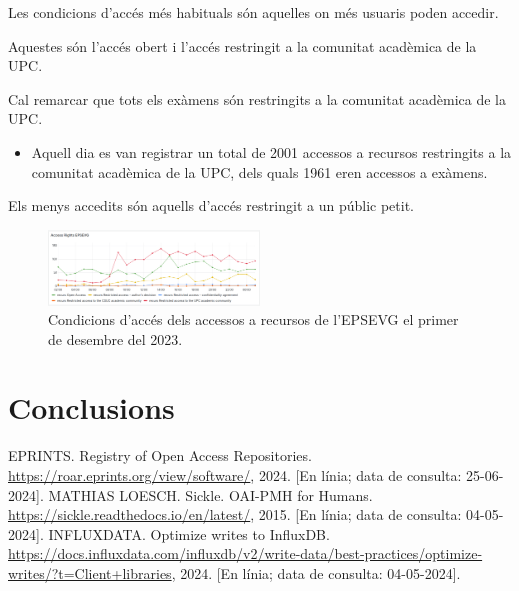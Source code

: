 \documentclass[lettersize,journal]{IEEEtran}
\begin{document}
Les condicions d'accés més habituals són aquelles on més usuaris poden accedir.

Aquestes són l'accés obert i l'accés restringit a la comunitat acadèmica de la UPC.

Cal remarcar que tots els exàmens són restringits a la comunitat acadèmica de la UPC.
\begin{itemize}
    \item Aquell dia es van registrar un total de 2001 accessos a recursos restringits a la comunitat acadèmica de la UPC, dels quals 1961 eren accessos a exàmens.
\end{itemize}

Els menys accedits són aquells d'accés restringit a un públic petit.

\begin{figure}[!t]
    \centerline{\includegraphics[width=0.5\textwidth]{figures/access-rights-epsevg}}
    \caption{Condicions d'accés dels accessos a recursos de l'EPSEVG el primer de desembre del 2023.}\label{fig:log-access-type}
\end{figure}

\section{Conclusions}\label{sec:conclusions}

\begin{thebibliography}{1}

    EPRINTS. Registry of Open Access Repositories. \url{https://roar.eprints.org/view/software/}, 2024. [En línia; data de consulta: 25-06-2024].
    MATHIAS LOESCH. Sickle. OAI-PMH for Humans. \url{https://sickle.readthedocs.io/en/latest/}, 2015. [En línia; data de consulta: 04-05-2024].
    INFLUXDATA. Optimize writes to InfluxDB. \url{https://docs.influxdata.com/influxdb/v2/write-data/best-practices/optimize-writes/?t=Client+libraries}, 2024. [En línia; data de consulta: 04-05-2024].
\end{thebibliography}
\end{document}
